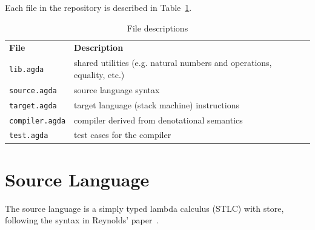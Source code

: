 \documentclass[12pt,a4paper]{report}
\theoremstyle{definition}
\begin{document}
        Each file in the repository is described in Table~\ref{tab: file_descriptions}. 
        \begin{table}[H]
            \centering
            \begin{tabular}{|l|l|l|}
                \hline
                \textbf{File} & \textbf{Description}\\
                \hhline{|=|=|}
                \texttt{lib.agda} & shared utilities (e.g. natural numbers and operations, equality, etc.) \\
                \hline
                \texttt{source.agda} & source language syntax \\
                \hline
                \texttt{target.agda} & target language (stack machine) instructions \\
                \hline
                \texttt{compiler.agda} & compiler derived from denotational semantics \\
                \hline
                \texttt{test.agda} & test cases for the compiler \\
                \hline
            \end{tabular}
            \caption{File descriptions}
            \label{tab: file_descriptions}
        \end{table}

    \section{Source Language} \label{sec: source}
    The source language is a simply typed lambda calculus (STLC) with store, following the syntax in Reynolds' paper~\autocite{Reynolds}.
\end{document}
